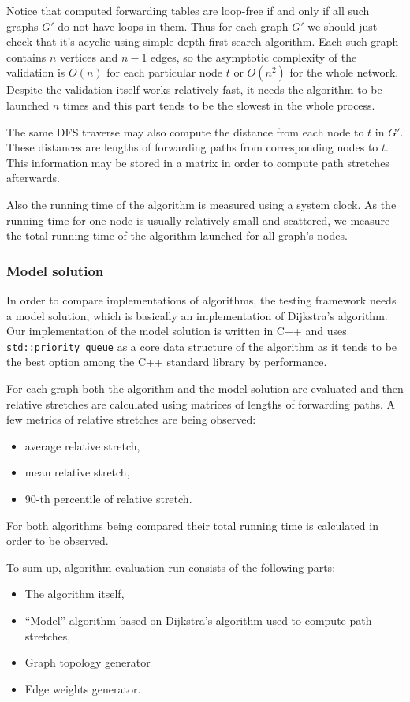 Notice that computed forwarding tables are loop-free if and only if all such graphs $G'$ do not have loops in them. Thus for each graph $G'$ we should just check that it's acyclic using simple depth-first search algorithm. Each such graph contains $n$ vertices and $n - 1$ edges, so the asymptotic complexity of the validation is $O(n)$ for each particular node $t$ or $O(n^2)$ for the whole network. Despite the validation itself works relatively fast, it needs the algorithm to be launched $n$ times and this part tends to be the slowest in the whole process.

The same DFS traverse may also compute the distance from each node to $t$ in $G'$. These distances are lengths of forwarding paths from corresponding nodes to $t$. This information may be stored in a matrix in order to compute path stretches afterwards.

Also the running time of the algorithm is measured using a system clock. As the running time for one node is usually relatively small and scattered, we measure the total running time of the algorithm launched for all graph's nodes.

\subsubsection{Model solution}

In order to compare implementations of algorithms, the testing framework needs a model solution, which is basically an implementation of Dijkstra's algorithm. Our implementation of the model solution is written in C++ and uses \texttt{std::priority\_queue} as a core data structure of the algorithm as it tends to be the best option among the C++ standard library by performance.

For each graph both the algorithm and the model solution are evaluated and then relative stretches are calculated using matrices of lengths of forwarding paths. A few metrics of relative stretches are being observed:
\begin{itemize}
\item average relative stretch,
\item mean relative stretch,
\item 90-th percentile of relative stretch.
\end{itemize}

For both algorithms being compared their total running time is calculated in order to be observed.

To sum up, algorithm evaluation run consists of the following parts:
\begin{itemize}
\item The algorithm itself,
\item ``Model'' algorithm based on Dijkstra's algorithm used to compute path stretches,
\item Graph topology generator
\item Edge weights generator.
\end{itemize}
